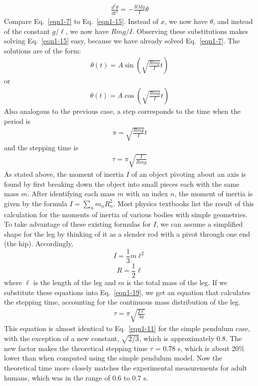 \begin{eqnarray}\label{eqn1-15}
\frac{d^2\theta}{dt^2} = -\frac{RMg}{I}\theta
\end{eqnarray}
Compare Eq.~\ref{eqn1-7} to Eq.~\ref{eqn1-15}.  Instead of $x$, we now have $\theta$, and instead of the constant $g/\ell$, we now have $Rmg/I$.  Observing these substitutions makes solving Eq.~\ref{eqn1-15} easy, because we have already solved Eq.~\ref{eqn1-7}. The solutions are of the form: 
\begin{eqnarray}\label{eqn1-16}
\theta(t) = A \sin\left(\sqrt{\frac{Rmg}{I}}t\right)
\end{eqnarray}
or
\begin{eqnarray}\label{eqn1-17}
\theta(t) = A \cos\left(\sqrt{\frac{Rmg}{I}}t\right)
\end{eqnarray}
Also analogous to the previous case, a step corresponds to the time when the period is 
\begin{eqnarray}\label{eqn1-18}
\pi = \sqrt{\frac{Rmg}{I}}t
\end{eqnarray}
and the stepping time is
\begin{eqnarray}\label{eqn1-19}
\tau = \pi\sqrt{\frac{I}{Rmg}}
\end{eqnarray}
As stated above, the moment of inertia $I$ of an object pivoting about an axis is found by first breaking down the object into small pieces each with the same mass $m$. After identifying each mass $m$ with an index $n$, the moment of inertia is given by the formula $I=\sum_n m_nR_n^2$.   Most physics textbooks list the result of this calculation for the moments of inertia of various bodies with simple geometries. To take advantage of these existing formulas for $I$, we can assume a simplified shape for the leg by thinking of it as a slender rod with a pivot through one end (the hip).  Accordingly, 
$$I=\frac{1}{3}m\ell^2$$
$$R = \frac{1}{2}\ell$$
where $\ell$ is the length of the leg and $m$ is the total mass of the leg. If we substitute these equations into Eq.~\ref{eqn1-19}, we get an equation that calculates the stepping time, accounting for the continuous mass distribution of the leg.
\begin{eqnarray}\label{eqn1-20}
\tau = \pi\sqrt{\frac{2\ell}{3g}}
\end{eqnarray}
This equation is almost identical to Eq.~\ref{eqn1-11} for the simple pendulum case, with the exception of a new constant, $\sqrt{2/3}$, which is approximately 0.8.  The new factor makes the theoretical stepping time $\tau$ = 0.78 s, which is about 20\% lower than when computed using the simple pendulum model.  Now the theoretical time more closely matches the experimental measurements for adult humans, which was in the range of 0.6 to 0.7 s.

